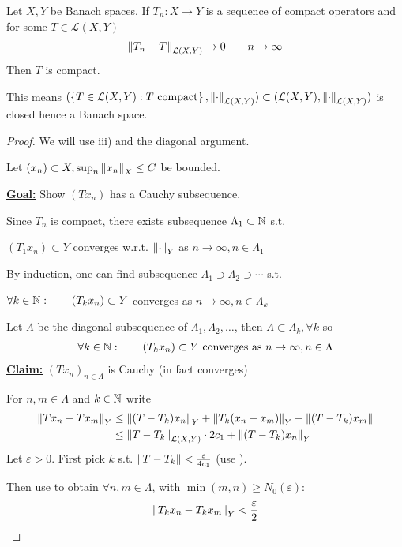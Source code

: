 \documentclass{article}
\begin{document}
\begin{theorem}\nl
\label{limit of compact operators}
    Let $X, Y$ be Banach spaces. If $T_n: X\to Y$ is a sequence of compact operators and for some $T \in \mathcal{L}(X,Y)$  
    \begin{align}
    \label{converging seq of compact operators}
      \left\|{T_n-T}\right\|_{\mathcal{L}(X,Y)} \to 0 \qquad n\to \infty    
    \end{align}
    Then $T$ is compact.
\end{theorem}  
\begin{remark}
    This means $(\left\{T \in \mathcal{L}(X,Y): T \ \text{compact} \right\}, \left\|{\cdot}\right\|_{\mathcal{L}(X,Y)}) \subset (\mathcal{L}(X,Y), \left\|{\cdot}\right\|_{\mathcal{L}(X,Y)})$ is closed hence a Banach space.
\end{remark}
\begin{proof}
    We will use  iii) and the diagonal argument.  

    Let $(x_n)\subset X, \sup_n \left\|{x_n}\right\|_X \leq C$ be bounded.  
    
    \underline{\textbf{Goal:}} Show $(Tx_n)$ has a Cauchy subsequence.  

    Since $T_n$ is compact, there exists subsequence $\Lambda_1 \subset \mathbb{N}$ s.t.  
    \begin{center}
        $(T_1 x_n) \subset Y$ converges w.r.t. $\left\|{\cdot}\right\|_Y$ as $n\to \infty, n\in \Lambda_1$   
    \end{center}
    By induction, one can find subsequence $\Lambda_1 \supset \Lambda_2 \supset \cdots$ s.t.  
    \begin{center}
        $\forall k \in \mathbb{N}: \qquad (T_k x_n) \subset Y$ converges as $n\to \infty, n\in \Lambda_k$
    \end{center}
    Let $\Lambda$ be the diagonal subsequence of $\Lambda_1, \Lambda_2, \ldots$, then $\Lambda \subset \Lambda_k, \forall k$ so  
    \begin{align}
    \label{convergence of diagonal of compact operators}
        \forall k \in \natu: \qquad (T_k x_n) \subset Y \ \text{converges\ as} \  n\to \infty, n\in \Lambda
    \end{align}
    \underline{\textbf{Claim:}} $(Tx_n)_{n\in \Lambda}$ is Cauchy (in fact converges)  
    
    For $n,m\in \Lambda$ and $k\in \mathbb{N}$ write
    \begin{align*}
        \left\|{Tx_n - Tx_m}\right\|_Y &\leq \left\|{(T-T_k)x_n}\right\|_Y + \left\|{T_k(x_n-x_m)}\right\|_Y + \left\|{(T-T_k)x_m}\right\|  \\
        &\leq \left\|{T-T_k}\right\|_{\mathcal{L}(X,Y)} \cdot 2c_1 + \left\|{(T-T_k)x_n}\right\|_Y
    \end{align*}
    Let $\varepsilon >0$. First pick $k$ s.t. $\left\|{T-T_k}\right\| < \frac{\varepsilon}{4c_1}$ (use ).  
    
    Then use  to obtain $\forall n,m \in \Lambda$, with $\min (m,n) \geq N_0(\varepsilon)$:  
    $$
    \left\|{T_kx_n-T_kx_m}\right\|_Y < \frac{\varepsilon}{2}
    $$
\end{proof}
\end{document}
